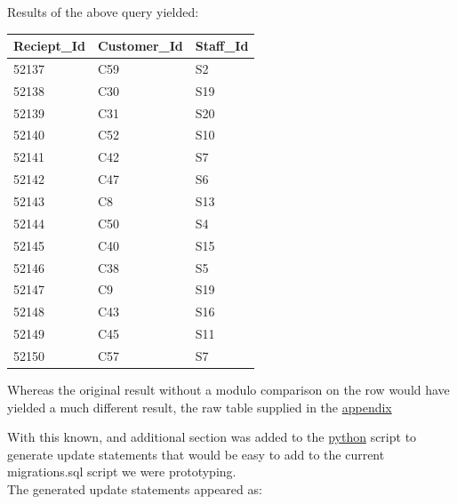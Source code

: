 \documentclass{article}
\begin{document}
            Results of the above query yielded:
            \begin{table}[H]
                \centering
                \begin{tabular}{|l|l|l|}
                \hline
                Reciept\_Id & Customer\_Id & Staff\_Id \\ \hline
                52137       & C59          & S2        \\ \hline
                52138       & C30          & S19       \\ \hline
                52139       & C31          & S20       \\ \hline
                52140       & C52          & S10       \\ \hline
                52141       & C42          & S7        \\ \hline
                52142       & C47          & S6        \\ \hline
                52143       & C8           & S13       \\ \hline
                52144       & C50          & S4        \\ \hline
                52145       & C40          & S15       \\ \hline
                52146       & C38          & S5        \\ \hline
                52147       & C9           & S19       \\ \hline
                52148       & C43          & S16       \\ \hline
                52149       & C45          & S11       \\ \hline
                52150       & C57          & S7        \\ \hline
                \end{tabular}
            \end{table}

            \newpage
            
            Whereas the original result without a modulo comparison on the row would have yielded
            a much different result, the raw table supplied in the \hyperref[sec:CTEResults]{\color{blue}appendix}
            \par
            With this known, and additional section was added to the \hyperref[sec:Python]{\color{blue}python} script to generate update statements
            that would be easy to add to the current migrations.sql script we were prototyping.
            \\
            The generated update statements appeared as:
\end{document}
